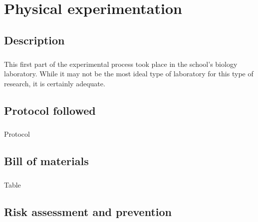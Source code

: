 \chapter{Physical experimentation}
\section{Description}
\paragraph{}This first part of the experimental process took place in the school's biology laboratory. While it may not be the most ideal type of laboratory for this type of research, it is certainly adequate.
\section{Protocol followed}
\paragraph{}Protocol
\section{Bill of materials}
\paragraph{}Table
\section{Risk assessment and prevention}

